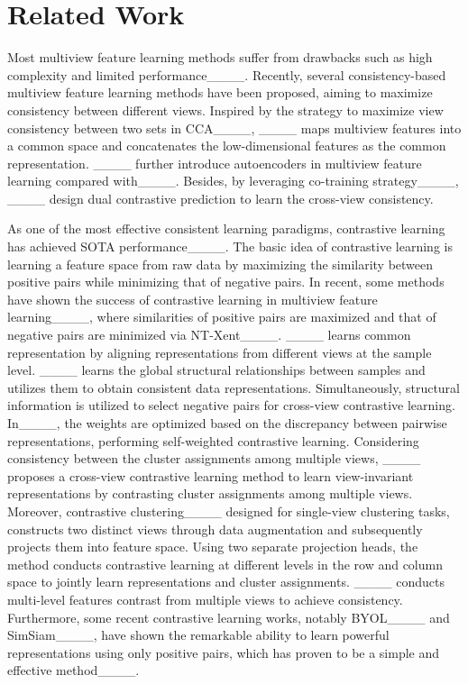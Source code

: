 \section{Related Work}
Most multiview feature learning methods suffer from drawbacks such as high complexity and limited performance____. Recently, several consistency-based multiview feature learning methods have been proposed, aiming to maximize consistency between different views. Inspired by the strategy to maximize view consistency between two sets in CCA____, ____ maps multiview features into a common space and concatenates the low-dimensional features as the common representation. ____ further introduce autoencoders in multiview feature learning compared with____.
Besides, by leveraging co-training strategy____, ____ design dual contrastive prediction to learn the cross-view consistency.

As one of the most effective consistent learning paradigms, contrastive learning has achieved SOTA performance____. The basic idea of contrastive learning is learning a feature space from raw data by maximizing the similarity between positive pairs while minimizing that of negative pairs. In recent, some methods have shown the success of contrastive learning in multiview feature learning____, where similarities of positive pairs are maximized and that of negative pairs are minimized via NT-Xent____. ____ learns common representation by aligning representations from different views at the sample level. ____ learns the global structural relationships between samples and utilizes them to obtain consistent data representations. Simultaneously, structural information is utilized to select negative pairs for cross-view contrastive learning. In____, the weights are optimized based on the discrepancy between pairwise representations, performing self-weighted contrastive learning. Considering consistency between the cluster assignments among multiple views, ____ proposes a cross-view contrastive learning method to learn view-invariant representations by contrasting cluster assignments among multiple views. Moreover, contrastive clustering____ designed for single-view clustering tasks, constructs two distinct views through data augmentation and subsequently projects them into feature space. Using two separate projection heads, the method conducts contrastive learning at different levels in the row and column space to jointly learn representations and cluster assignments. ____ conducts multi-level features contrast from multiple views to achieve consistency. Furthermore, some recent contrastive learning works, notably BYOL____ and SimSiam____, have shown the remarkable ability to learn powerful representations using only positive pairs, which has proven to be a simple and effective method____.